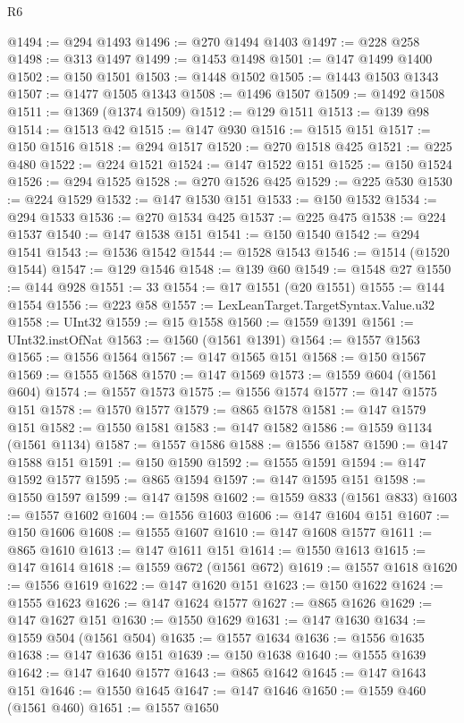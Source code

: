 \begin{lexlean}{R6}
\begin{coremodule}
@1494 := @294 @1493
@1496 := @270 @1494 @1403
@1497 := @228 @258
@1498 := @313 @1497
@1499 := @1453 @1498
@1501 := @147 @1499 @1400
@1502 := @150 @1501
@1503 := @1448 @1502
@1505 := @1443 @1503 @1343
@1507 := @1477 @1505 @1343
@1508 := @1496 @1507
@1509 := @1492 @1508
@1511 := @1369 (@1374 @1509)
@1512 := @129 @1511
@1513 := @139 @98
@1514 := @1513 @42
@1515 := @147 @930
@1516 := @1515 @151
@1517 := @150 @1516
@1518 := @294 @1517
@1520 := @270 @1518 @425
@1521 := @225 @480
@1522 := @224 @1521
@1524 := @147 @1522 @151
@1525 := @150 @1524
@1526 := @294 @1525
@1528 := @270 @1526 @425
@1529 := @225 @530
@1530 := @224 @1529
@1532 := @147 @1530 @151
@1533 := @150 @1532
@1534 := @294 @1533
@1536 := @270 @1534 @425
@1537 := @225 @475
@1538 := @224 @1537
@1540 := @147 @1538 @151
@1541 := @150 @1540
@1542 := @294 @1541
@1543 := @1536 @1542
@1544 := @1528 @1543
@1546 := @1514 (@1520 @1544)
@1547 := @129 @1546
@1548 := @139 @60
@1549 := @1548 @27
@1550 := @144 @928
@1551 := 33
@1554 := @17 @1551 (@20 @1551)
@1555 := @144 @1554
@1556 := @223 @58
@1557 := LexLeanTarget.TargetSyntax.Value.u32
@1558 := UInt32
@1559 := @15 @1558
@1560 := @1559 @1391
@1561 := UInt32.instOfNat
@1563 := @1560 (@1561 @1391)
@1564 := @1557 @1563
@1565 := @1556 @1564
@1567 := @147 @1565 @151
@1568 := @150 @1567
@1569 := @1555 @1568
@1570 := @147 @1569
@1573 := @1559 @604 (@1561 @604)
@1574 := @1557 @1573
@1575 := @1556 @1574
@1577 := @147 @1575 @151
@1578 := @1570 @1577
@1579 := @865 @1578
@1581 := @147 @1579 @151
@1582 := @1550 @1581
@1583 := @147 @1582
@1586 := @1559 @1134 (@1561 @1134)
@1587 := @1557 @1586
@1588 := @1556 @1587
@1590 := @147 @1588 @151
@1591 := @150 @1590
@1592 := @1555 @1591
@1594 := @147 @1592 @1577
@1595 := @865 @1594
@1597 := @147 @1595 @151
@1598 := @1550 @1597
@1599 := @147 @1598
@1602 := @1559 @833 (@1561 @833)
@1603 := @1557 @1602
@1604 := @1556 @1603
@1606 := @147 @1604 @151
@1607 := @150 @1606
@1608 := @1555 @1607
@1610 := @147 @1608 @1577
@1611 := @865 @1610
@1613 := @147 @1611 @151
@1614 := @1550 @1613
@1615 := @147 @1614
@1618 := @1559 @672 (@1561 @672)
@1619 := @1557 @1618
@1620 := @1556 @1619
@1622 := @147 @1620 @151
@1623 := @150 @1622
@1624 := @1555 @1623
@1626 := @147 @1624 @1577
@1627 := @865 @1626
@1629 := @147 @1627 @151
@1630 := @1550 @1629
@1631 := @147 @1630
@1634 := @1559 @504 (@1561 @504)
@1635 := @1557 @1634
@1636 := @1556 @1635
@1638 := @147 @1636 @151
@1639 := @150 @1638
@1640 := @1555 @1639
@1642 := @147 @1640 @1577
@1643 := @865 @1642
@1645 := @147 @1643 @151
@1646 := @1550 @1645
@1647 := @147 @1646
@1650 := @1559 @460 (@1561 @460)
@1651 := @1557 @1650

\end{coremodule}
\end{lexlean}
